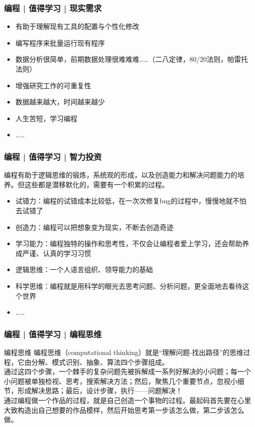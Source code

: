 \begin{frame}
  \frametitle{编程 | 值得学习 | 现实需求}
  \begin{itemize}
    \item 有助于理解现有工具的配置与个性化修改
    \item 编写程序来批量运行现有程序
    \item 数据分析很简单，前期数据处理很难难难……（二八定律，80/20法则，帕雷托法则）
    \item 增强研究工作的可重复性
    \item 数据越来越大，时间越来越少
    \item 人生苦短，学习编程
    \item ……
  \end{itemize}
\end{frame}

\begin{frame}
  \frametitle{编程 | 值得学习 | 智力投资}
  编程有助于逻辑思维的锻炼，系统观的形成，以及创造能力和解决问题能力的培养。但这些都是潜移默化的，需要有一个积累的过程。
    \begin{itemize}
      \item 试错力：编程的试错成本比较低，在一次次修复bug的过程中，慢慢地就不怕去试错了
      \item 创造力：编程可以把想象变为现实，不断去创造奇迹
      \item 学习能力：编程独特的操作和思考性，不仅会让编程者爱上学习，还会帮助养成严谨、认真的学习习惯
      \item 逻辑思维：一个人语言组织、领导能力的基础
      \item 科学思维：编程就是用科学的眼光去思考问题、分析问题，更全面地去看待这个世界
      \item ……
    \end{itemize}
\end{frame}

\begin{frame}
  \frametitle{编程 | 值得学习 | \alert{编程思维}}
  \begin{block}{编程思维}
    编程思维（computational thinking）就是“理解问题-找出路径”的思维过程，它由分解、模式识别、抽象、算法四个步骤组成。\\
    \vspace{1em}
通过这四个步骤，一个棘手的复杂问题先被拆解成一系列好解决的小问题；每一个小问题被单独检视、思考，搜索解决方法；然后，聚焦几个重要节点，忽视小细节，形成解决思路；最后，设计步骤，执行——问题解决！\\
\vspace{1em}
通过编程做一个作品的过程，就是自己创造一个事物的过程。最起码首先要在心里大致构造出自己想要的作品模样，然后开始思考第一步该怎么做，第二步该怎么做。
  \end{block}
\end{frame}

